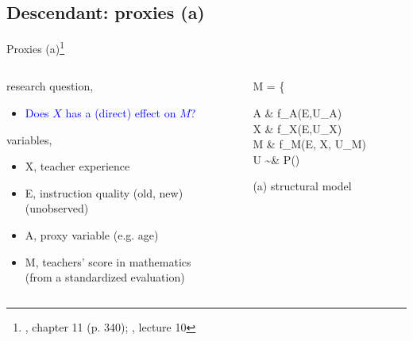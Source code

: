 %
%
\subsection{Descendant: proxies (a)}
%
%
\begin{frame}[t, negative]
	\subsectionpage
\end{frame}
%
%
\begin{frame}
	{Proxies (a)\footnote{\citet{McElreath_2020}, chapter 11 (p. 340); \citet{McElreath_2022}, lecture 10}}
	\begin{columns}
		\begin{column}{0.5\textwidth}
			research question, 
			\begin{itemize}
				\item \textcolor{blue}{Does $X$ has a (direct) effect on $M$?}
			\end{itemize}
			
			variables,
			\begin{itemize}
				\item X, teacher experience
				\item E, instruction quality (old, new) \\
				{\small (unobserved)}
				\item A, proxy variable (e.g. age)
				\item M, teachers' score in mathematics \\
				{\small (from a standardized evaluation)}
			\end{itemize}
		\end{column}
		\begin{column}{0.5\textwidth}  
			\begin{equ}
				M = \left\{ \begin{aligned} 
					A \leftarrow & \; f_{A}(E,U_{A}) \\
					X \leftarrow & \; f_{X}(E,U_{X}) \\
					M \leftarrow & \; f_{M}(E, X, U_{M})\\
					U \sim & \; P()
				\end{aligned} \right
				\caption*{(a) structural model}
			\end{equ}
			\begin{figure}
\end{figure}
\end{column}
\end{columns}
\end{frame}
